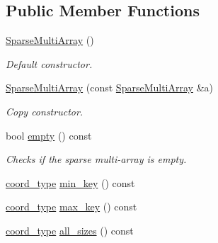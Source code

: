 \subsection*{Public Member Functions}
\begin{DoxyCompactItemize}
\item 
\hypertarget{class_d_o_1_1_sparse_multi_array_aa31288ffe2bcc901d1bea4ab9291c278}{\hyperlink{class_d_o_1_1_sparse_multi_array_aa31288ffe2bcc901d1bea4ab9291c278}{Sparse\-Multi\-Array} ()}\label{class_d_o_1_1_sparse_multi_array_aa31288ffe2bcc901d1bea4ab9291c278}

\begin{DoxyCompactList}\small\item\em Default constructor. \end{DoxyCompactList}\item 
\hypertarget{class_d_o_1_1_sparse_multi_array_adb2b3256fac8e82cdbb7532324788461}{\hyperlink{class_d_o_1_1_sparse_multi_array_adb2b3256fac8e82cdbb7532324788461}{Sparse\-Multi\-Array} (const \hyperlink{class_d_o_1_1_sparse_multi_array}{Sparse\-Multi\-Array} \&a)}\label{class_d_o_1_1_sparse_multi_array_adb2b3256fac8e82cdbb7532324788461}

\begin{DoxyCompactList}\small\item\em Copy constructor. \end{DoxyCompactList}\item 
\hypertarget{class_d_o_1_1_sparse_multi_array_ac6e61de369e994009e36f344f99c15ad}{bool \hyperlink{class_d_o_1_1_sparse_multi_array_ac6e61de369e994009e36f344f99c15ad}{empty} () const }\label{class_d_o_1_1_sparse_multi_array_ac6e61de369e994009e36f344f99c15ad}

\begin{DoxyCompactList}\small\item\em Checks if the sparse multi-\/array is empty. \end{DoxyCompactList}\item 
\hyperlink{class_d_o_1_1_sparse_multi_array_ae4fb477425bbeb20329d300396ac2582}{coord\-\_\-type} \hyperlink{class_d_o_1_1_sparse_multi_array_af74fcb5e1793fae740aa6cfa3da7b857}{min\-\_\-key} () const 
\item 
\hyperlink{class_d_o_1_1_sparse_multi_array_ae4fb477425bbeb20329d300396ac2582}{coord\-\_\-type} \hyperlink{class_d_o_1_1_sparse_multi_array_ad1a015f476d71c75dc93dadd5e344aec}{max\-\_\-key} () const 
\item 
\hypertarget{class_d_o_1_1_sparse_multi_array_a96c8baba4bb71887f51755f43047c026}{\hyperlink{class_d_o_1_1_sparse_multi_array_ae4fb477425bbeb20329d300396ac2582}{coord\-\_\-type} \hyperlink{class_d_o_1_1_sparse_multi_array_a96c8baba4bb71887f51755f43047c026}{all\-\_\-sizes} () const }\label{class_d_o_1_1_sparse_multi_array_a96c8baba4bb71887f51755f43047c026}


\end{DoxyCompactItemize}
